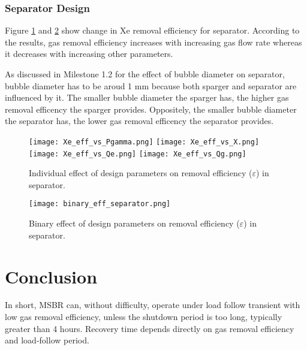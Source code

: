 \newpage
\FloatBarrier

\subsubsection{Separator Design}

    Figure \ref{fig:individual_eff_separator} and \ref{fig:binary_eff_separator}
    show change in Xe removal efficiency for separator. According to the
    results, gas removal efficiency increases with increasing gas flow rate
    whereas it decreases with increasing other parameters.

    As discussed in Milestone 1.2 for the effect of bubble diameter on separator, bubble diameter has to be aroud 1 mm because both sparger and separator are influenced by it. The smaller bubble diameter the sparger has, the higher gas removal efficency the sparger provides. Oppositely, the smaller bubble diameter the separator has, the lower gas removal efficency the separator provides.

\begin{figure}[htbp!]
    \begin{center}
        \texttt{[image: Xe\_eff\_vs\_Pgamma.png]}
        \texttt{[image: Xe\_eff\_vs\_X.png]}
        \texttt{[image: Xe\_eff\_vs\_Qe.png]}
        \texttt{[image: Xe\_eff\_vs\_Qg.png]}
    \end{center}
    \caption{Individual effect of design parameters on removal
    efficiency
        ($\varepsilon$) in separator.}
    \label{fig:individual_eff_separator}
\end{figure}

\begin{figure}[htbp!]
    \begin{center}
        \texttt{[image: binary\_eff\_separator.png]}
    \end{center}
    \caption{Binary effect of design parameters on removal
    efficiency
        ($\varepsilon$) in separator.}
    \label{fig:binary_eff_separator}
\end{figure}

\newpage
\FloatBarrier

\section{Conclusion}

    In short, MSBR can, without difficulty, operate under load follow transient
    with low gas removal efficiency, unless the shutdown period is too long,
    typically greater than 4 hours. Recovery time depends directly on gas
    removal efficiency and load-follow period.

